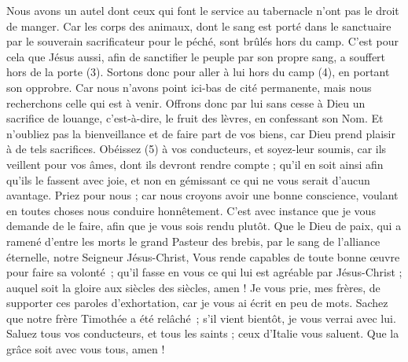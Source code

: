 \begin{multicols}{2}
Nous avons un autel dont ceux qui font le service au tabernacle n'ont pas le droit de manger.
Car les corps des animaux, dont le sang est porté dans le sanctuaire par le souverain sacrificateur pour le péché, sont brûlés hors du camp.
C'est pour cela que Jésus aussi, afin de sanctifier le peuple par son propre sang, a souffert hors de la porte (3).
Sortons donc pour aller à lui hors du camp (4), en portant son opprobre.
Car nous n'avons point ici-bas de cité permanente, mais nous recherchons celle qui est à venir.
Offrons donc par lui sans cesse à Dieu un sacrifice de louange, c'est-à-dire, le fruit des lèvres, en confessant son Nom.
Et n'oubliez pas la bienveillance et de faire part de vos biens, car Dieu prend plaisir à de tels sacrifices.
Obéissez (5) à vos conducteurs, et soyez-leur soumis, car ils veillent pour vos âmes, dont ils devront rendre compte ; qu’il en soit ainsi afin qu’ils le fassent avec joie, et non en gémissant ce qui ne vous serait d’aucun avantage.
Priez pour nous ; car nous croyons avoir une bonne conscience, voulant en toutes choses nous conduire honnêtement.
C’est avec instance que je vous demande de le faire, afin que je vous sois rendu plutôt.
\TextTitle{[Conclusion]}
Que le Dieu de paix, qui a ramené d'entre les morts le grand Pasteur des brebis, par le sang de l'alliance éternelle, notre Seigneur Jésus-Christ,
Vous rende capables de toute bonne œuvre pour faire sa volonté ; qu’il fasse en vous ce qui lui est agréable par Jésus-Christ ; auquel soit la gloire aux siècles des siècles, amen !
Je vous prie, mes frères, de supporter ces paroles d'exhortation, car je vous ai écrit en peu de mots.
Sachez que notre frère Timothée a été relâché ; s'il vient bientôt, je vous verrai avec lui.
Saluez tous vos conducteurs, et tous les saints ; ceux d'Italie vous saluent.
Que la grâce soit avec vous tous, amen !
\PPE{}
\end{multicols}
